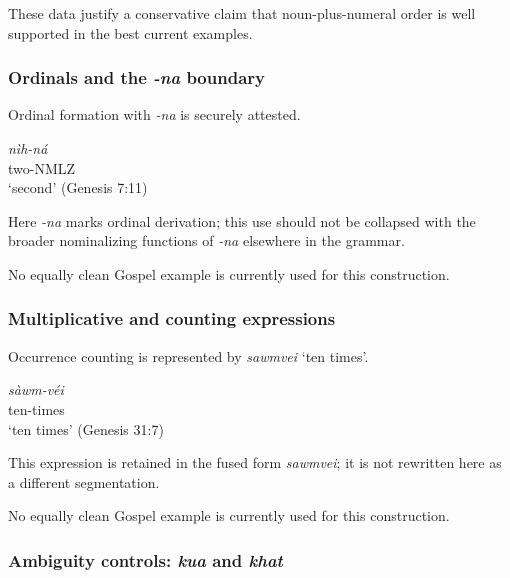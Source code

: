 \documentclass[
  11pt,
  a4paper,
]{article}
\newcommand{\tdim}[1]{\textit{#1}}
\newcommand{\tdimword}[1]{\textit{#1}}
\renewcommand{\textsc}[1]{{\footnotesize\MakeUppercase{#1}}}
\newcommand{\glossquote}[1]{`#1'}
\begin{document}
These data justify a conservative claim that noun-plus-numeral order is
well supported in the best current examples.

\subsubsection{\texorpdfstring{Ordinals and the \tdim{-na}
boundary}{Ordinals and the  boundary}}\label{ordinals-and-the-boundary}

Ordinal formation with \tdim{-na} is securely attested.

\begin{exe}
\ex \label{ex:num-nihna}
\gll \tdimword{nìh-ná} \\
     two-\textsc{nmlz} \\
\glt \glossquote{second} (Genesis 7:11)
\end{exe}

Here \tdim{-na} marks ordinal derivation; this use should not be
collapsed with the broader nominalizing functions of \tdim{-na}
elsewhere in the grammar.

No equally clean Gospel example is currently used for this construction.

\subsubsection{Multiplicative and counting
expressions}\label{multiplicative-and-counting-expressions}

Occurrence counting is represented by \tdim{sawmvei}
\glossquote{ten times}.

\begin{exe}
\ex \label{ex:num-sawmvei}
\gll \tdimword{sàwm-véi} \\
     ten-times \\
\glt \glossquote{ten times} (Genesis 31:7)
\end{exe}

This expression is retained in the fused form \tdim{sawmvei}; it is not
rewritten here as a different segmentation.

No equally clean Gospel example is currently used for this construction.

\subsubsection{\texorpdfstring{Ambiguity controls: \tdim{kua} and
\tdim{khat}}{Ambiguity controls:  and }}\label{ambiguity-controls-and}
\end{document}
